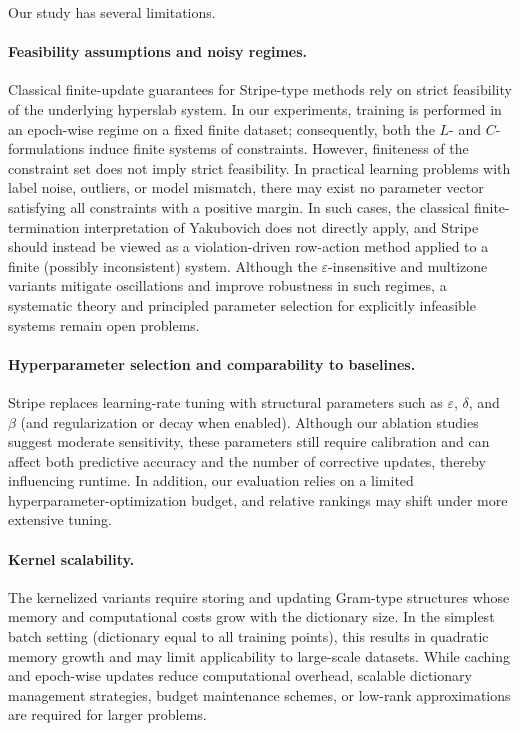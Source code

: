 \documentclass[a4paper,fleqn]{cas-sc}
\begin{document}
Our study has several limitations.

\paragraph{Feasibility assumptions and noisy regimes.}
Classical finite-update guarantees for Stripe-type methods rely on strict feasibility of the underlying hyperslab system. 
In our experiments, training is performed in an epoch-wise regime on a fixed finite dataset; consequently, both the $L$- and $C$-formulations induce finite systems of constraints. 
However, finiteness of the constraint set does not imply strict feasibility. 
In practical learning problems with label noise, outliers, or model mismatch, there may exist no parameter vector satisfying all constraints with a positive margin. 
In such cases, the classical finite-termination interpretation of Yakubovich does not directly apply, and Stripe should instead be viewed as a violation-driven row-action method applied to a finite (possibly inconsistent) system. 
Although the $\varepsilon$-insensitive and multizone variants mitigate oscillations and improve robustness in such regimes, a systematic theory and principled parameter selection for explicitly infeasible systems remain open problems.

\paragraph{Hyperparameter selection and comparability to baselines.}
Stripe replaces learning-rate tuning with structural parameters such as $\varepsilon$, $\delta$, and $\beta$ (and regularization or decay when enabled). 
Although our ablation studies suggest moderate sensitivity, these parameters still require calibration and can affect both predictive accuracy and the number of corrective updates, thereby influencing runtime. 
In addition, our evaluation relies on a limited hyperparameter-optimization budget, and relative rankings may shift under more extensive tuning.

\paragraph{Kernel scalability.}
The kernelized variants require storing and updating Gram-type structures whose memory and computational costs grow with the dictionary size. 
In the simplest batch setting (dictionary equal to all training points), this results in quadratic memory growth and may limit applicability to large-scale datasets. 
While caching and epoch-wise updates reduce computational overhead, scalable dictionary management strategies, budget maintenance schemes, or low-rank approximations are required for larger problems.
\end{document}
